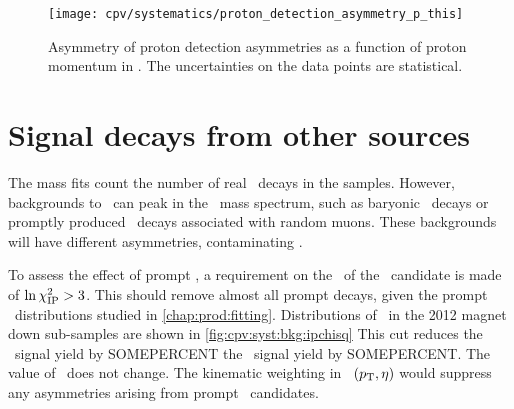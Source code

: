 \begin{table}
  \centering
  \caption{%
    Proton detection asymmetries measured using simulated data in bins of 
    proton momentum~\cite{Aaij:2015fea}.
  }
  \label{tab:cpv:syst:asym:proton}
  
\end{table}

\begin{figure}
  \centering
  \texttt{[image: cpv/systematics/proton\_detection\_asymmetry\_p\_this]}
  \caption{%
    Asymmetry of proton detection asymmetries as a function of proton momentum 
    in \si{\GeVc}.
    The uncertainties on the data points are statistical.
  }
  \label{fig:cpv:syst:asym:proton_this}
\end{figure}

\begin{table}
  \centering
  \caption{%
    Shifts in the measurement of \dACP\ due to background asymmetries not 
    complete removed during the kinematic weighting.
    The total shift $\Delta{A}$ is the sum of the individual ones, and all 
    shifts are given in \num{e-4}.
  }
  \label{tab:cpv:syst:asym:results}
  
\end{table}

\section{Signal decays from other sources}
\label{chap:cpv:syst:bkg}

The mass fits count the number of real \PLambdac\ decays in the samples.
However, backgrounds to \LbToLcmuX\ can peak in the \PLambdac\ mass spectrum, 
such as baryonic \PB\ decays or promptly produced \PLambdac\ decays associated 
with random muons.
These backgrounds will have different asymmetries, contaminating \dACP\@.

To assess the effect of prompt \PLambdac, a requirement on the \ipchisq\ of the 
\PLambdac\ candidate is made of $\ln\chi^2_{\textnormal{IP}} > 3$.
This should remove almost all prompt decays, given the prompt \lnipchisq\ 
distributions studied in \cref{chap:prod:fitting}.
Distributions of \lnipchisq\ in the 2012 magnet down sub-samples are shown in 
\cref{fig:cpv:syst:bkg:ipchisq}
This cut reduces the \pKK\ signal yield by SOMEPERCENT the \ppipi\ signal yield 
by SOMEPERCENT\@.
The value of \dACP\ does not change.
The kinematic weighting in \PLambdac\ $(p_{\textnormal{T}}, \eta)$ would suppress any 
asymmetries arising from prompt \PLambdac\ candidates.

